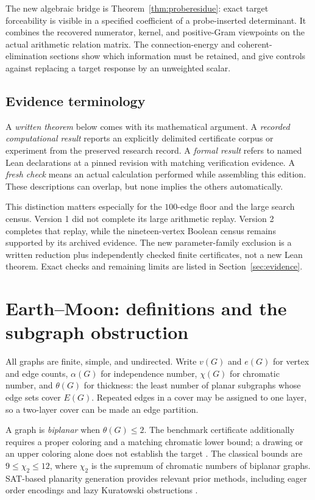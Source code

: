 \documentclass[11pt,letterpaper]{article}
\theoremstyle{definition}
\theoremstyle{remark}\newtheorem{remark}[theorem]{Remark}
\begin{document}
The new algebraic bridge is Theorem~\ref{thm:proberesidue}: exact target forceability is visible in a specified coefficient of a probe-inserted determinant. It combines the recovered numerator, kernel, and positive-Gram viewpoints on the actual arithmetic relation matrix. The connection-energy and coherent-elimination sections show which information must be retained, and give controls against replacing a target response by an unweighted scalar.

\subsection{Evidence terminology}
A \emph{written theorem} below comes with its mathematical argument. A \emph{recorded computational result} reports an explicitly delimited certificate corpus or experiment from the preserved research record. A \emph{formal result} refers to named Lean declarations at a pinned revision with matching verification evidence. A \emph{fresh check} means an actual calculation performed while assembling this edition. These descriptions can overlap, but none implies the others automatically.

This distinction matters especially for the $100$-edge floor and the large search census. Version 1 did not complete its large arithmetic replay. Version 2 completes that replay, while the nineteen-vertex Boolean census remains supported by its archived evidence. The new parameter-family exclusion is a written reduction plus independently checked finite certificates, not a new Lean theorem. Exact checks and remaining limits are listed in Section~\ref{sec:evidence}.

\section{Earth--Moon: definitions and the subgraph obstruction}
All graphs are finite, simple, and undirected. Write $v(G)$ and $e(G)$ for vertex and edge counts, $\alpha(G)$ for independence number, $\chi(G)$ for chromatic number, and $\theta(G)$ for thickness: the least number of planar subgraphs whose edge sets cover $E(G)$. Repeated edges in a cover may be assigned to one layer, so a two-layer cover can be made an edge partition.

A graph is \emph{biplanar} when $\theta(G)\leq2$. The benchmark certificate additionally requires a proper coloring and a matching chromatic lower bound; a drawing or an upper coloring alone does not establish the target \cite{epochEM}. The classical bounds are $9\leq\chi_2\leq12$, where $\chi_2$ is the supremum of chromatic numbers of biplanar graphs. SAT-based planarity generation provides relevant prior methods, including eager order encodings and lazy Kuratowski obstructions \cite{KSS}.
\end{document}
